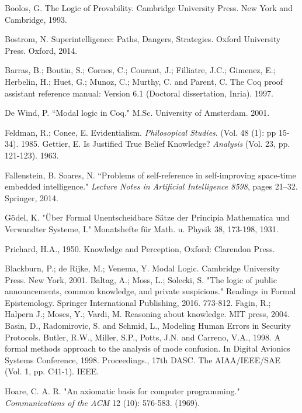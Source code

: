 \begin{thebibliography}{9}
	 	Boolos, G. The Logic of Provability. Cambridge University Press. New York and Cambridge, 1993.
	 	
		Bostrom, N. Superintelligence: Paths, Dangers, Strategies. Oxford University Press. Oxford, 2014. 	
	 	
	 	Barras, B.; Boutin, S.; Cornes, C.; Courant, J.; Filliatre, J.C.; Gimenez, E.; Herbelin, H.; Huet, G.; Munoz, C.; Murthy, C. and Parent, C. The Coq proof assistant reference manual: Version 6.1 (Doctoral dissertation, Inria). 1997.
	 	
	 	De Wind, P. ``Modal logic in Coq." M.Sc. University of Amsterdam. 2001.
	 	
	 	Feldman, R.; Conee, E. Evidentialism. {\em Philosopical Studies}. (Vol. 48 (1): pp 15-34). 1985.
	 	Gettier, E. Is Justified True Belief Knowledge? {\em Analysis} (Vol. 23, pp. 121-123). 1963.
	 	
	 	Fallenstein, B. Soares, N. ``Problems of self-reference in self-improving space-time embedded intelligence." {\em Lecture Notes in Artificial Intelligence 8598}, pages 21–32. Springer, 2014.
	 	
	 	
	 	 Gödel, K. "Über Formal Unentscheidbare Sätze der Principia Mathematica und Verwandter Systeme, I." Monatshefte für Math. u. Physik 38, 173-198, 1931. 
	 	 
	 	Prichard, H.A., 1950. Knowledge and Perception, Oxford: Clarendon Press.
	 	
	 	 Blackburn, P.; de Rijke, M.; Venema, Y. Modal Logic. Cambridge University Press. New York, 2001.
	 	 Baltag, A.; Moss, L.; Solecki, S. "The logic of public announcements, common knowledge, and private suspicions." Readings in Formal Epistemology. Springer International Publishing, 2016. 773-812.
	 	 Fagin, R.; Halpern J.; Moses, Y.; Vardi, M. Reasoning about knowledge. MIT press, 2004.
	 	 Basin, D., Radomirovic, S. and Schmid, L., Modeling Human Errors in Security Protocols.
	 	 Butler, R.W., Miller, S.P., Potts, J.N. and Carreno, V.A., 1998. A formal methods approach to the analysis of mode confusion. In Digital Avionics Systems Conference, 1998. Proceedings., 17th DASC. The AIAA/IEEE/SAE (Vol. 1, pp. C41-1). IEEE.
	 	
	 	
	 	Hoare, C. A. R. "An axiomatic basis for computer programming." \emph{Communications of the ACM} 12 (10): 576-583. (1969).
	 	

\end{thebibliography}
